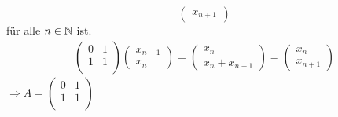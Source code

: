 \documentclass{HM}
\begin{document}
\begin{enumerate}
\begin{enumerate}
$$\begin{pmatrix}
			x_{n+1}
		\end{pmatrix}$$ für alle $n\in\mathbb{N}$ ist.\\
		\begin{align*}
			\begin{pmatrix}
				0&1\\
				1&1\\		
			\end{pmatrix}						
			\begin{pmatrix}
				x_{n-1}\\
				x_n
			\end{pmatrix}=\begin{pmatrix}
				x_n\\
				x_n+x_{n-1}
			\end{pmatrix}=\begin{pmatrix}
				x_n\\
				x_{n+1}
			\end{pmatrix}
		\end{align*}	
		$\Rightarrow A=\begin{pmatrix}
				0&1\\
				1&1\\		
			\end{pmatrix}$
			

\end{enumerate}
\end{enumerate}
\end{document}
